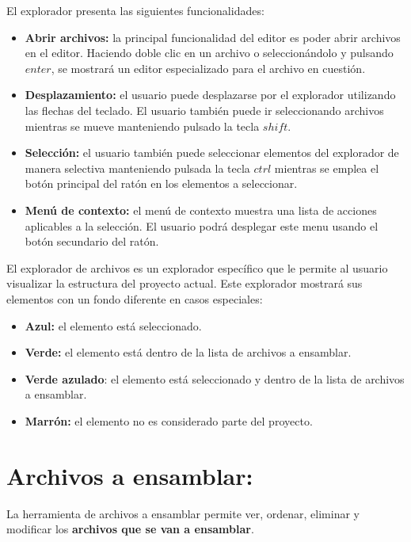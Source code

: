 \noindent El explorador presenta las siguientes funcionalidades:
\begin{itemize}
    \item \textbf{Abrir archivos:} la principal funcionalidad del editor
    es poder abrir archivos en el editor.
    Haciendo doble clic en un archivo o seleccionándolo y pulsando
    $enter$, se mostrará un editor especializado para el archivo
    en cuestión.
    \item \textbf{Desplazamiento:} el usuario puede desplazarse por el
    explorador utilizando las flechas del teclado.
    El usuario también puede ir seleccionando archivos mientras se
    mueve manteniendo pulsado la tecla $shift$.
    \item \textbf{Selección:} el usuario también puede seleccionar
    elementos del explorador de manera selectiva manteniendo
    pulsada la tecla $ctrl$ mientras se emplea el botón principal
    del ratón en los elementos a seleccionar.
    \item \textbf{Menú de contexto:} el menú de contexto muestra
    una lista de acciones aplicables a la selección.
    El usuario podrá desplegar este menu usando el botón secundario
    del ratón.
\end{itemize}

\noindent El explorador de archivos es un explorador específico
que le permite al usuario visualizar la estructura del proyecto
actual.
Este explorador mostrará sus elementos con un fondo diferente en
casos especiales:
\begin{itemize}
    \item \textbf{Azul:} el elemento está seleccionado.
    \item \textbf{Verde:} el elemento está dentro de la lista de
    archivos a ensamblar.
    \item \textbf{Verde azulado}: el elemento está seleccionado y
    dentro de la lista de archivos a ensamblar.
    \item \textbf{Marrón:} el elemento no es considerado
    parte del proyecto.
\end{itemize}


\section{Archivos a ensamblar:}\label{sec:archivos-a-ensamblar:}

La herramienta de archivos a ensamblar permite
ver, ordenar, eliminar y modificar los \textbf{archivos que se van a ensamblar}.

